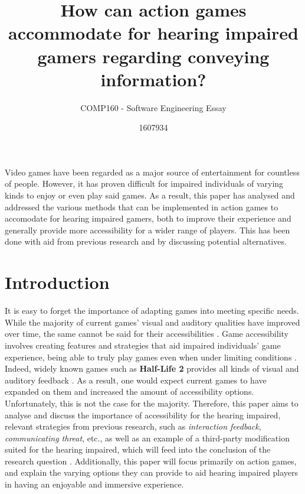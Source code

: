\documentclass{scrartcl}
\title{How can action games accommodate for hearing impaired gamers regarding conveying information?}
\subtitle{COMP160 - Software Engineering Essay}
\author{1607934}
\begin{document}
\maketitle

\abstract
Video games have been regarded as a major source of entertainment for countless of people. However, it has proven difficult for impaired individuals of varying kinds to enjoy or even play said games. As a result, this paper has analysed and addressed the various methods that can be implemented in action games to accomodate for hearing impaired gamers, both to improve their experience and generally provide more accessibility for a wider range of players. This has been done with aid from previous research and by discussing potential alternatives.

\section{Introduction}
It is easy to forget the importance of adapting games into meeting specific needs. While the majority of current games' visual and auditory qualities have improved over time, the same cannot be said for their accessibilities \cite{McPheron}. Game accessibility involves creating features and strategies that aid impaired individuals' game experience, being able to truly play games even when under limiting conditions \cite{Bierre}. Indeed, widely known games such as \textbf{Half-Life 2} provides all kinds of visual and auditory feedback \cite{Denise} \cite{Coutinho}. As a result, one would expect current games to have expanded on them and increased the amount of accessibility options. Unfortunately, this is not the case for the majority. Therefore, this paper aims to analyse and discuss the importance of accessibility for the hearing impaired, relevant strategies from previous research, such as \textit{interaction feedback}, \textit{communicating threat}, etc., as well as an example of a third-party modification suited for the hearing impaired, which will feed into the conclusion of the research question \cite{Arch}. Additionally, this paper will focus primarily on action games, and explain the varying options they can provide to aid hearing impaired players in having an enjoyable and immersive experience.
\end{document}
